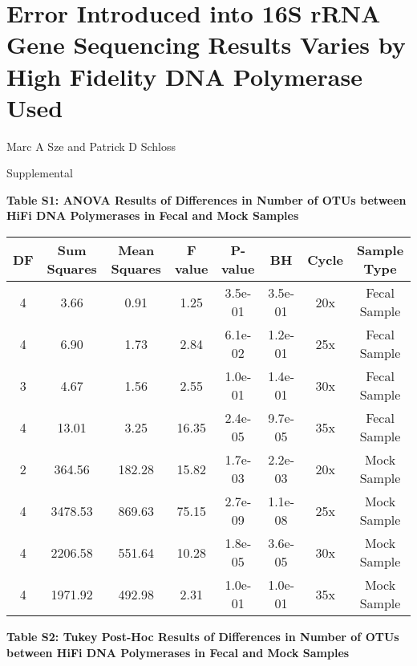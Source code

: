 \documentclass[11pt,]{article}
\title{}
\author{}
\date{}
\begin{document}
\section{Error Introduced into 16S rRNA Gene Sequencing Results Varies
by High Fidelity DNA Polymerase
Used}\label{error-introduced-into-16s-rrna-gene-sequencing-results-varies-by-high-fidelity-dna-polymerase-used}

\vspace{10mm}

\begin{center}
Marc A Sze and Patrick D Schloss

\vspace{10mm}

Supplemental
\end{center}

\newpage

\textbf{Table S1: ANOVA Results of Differences in Number of OTUs between
HiFi DNA Polymerases in Fecal and Mock Samples}

\begin{longtable}[]{@{}cccccccc@{}}
\toprule
DF & Sum Squares & Mean Squares & F value & P-value & BH & Cycle &
Sample Type\tabularnewline
\midrule
\endhead
4 & 3.66 & 0.91 & 1.25 & 3.5e-01 & 3.5e-01 & 20x & Fecal
Sample\tabularnewline
4 & 6.90 & 1.73 & 2.84 & 6.1e-02 & 1.2e-01 & 25x & Fecal
Sample\tabularnewline
3 & 4.67 & 1.56 & 2.55 & 1.0e-01 & 1.4e-01 & 30x & Fecal
Sample\tabularnewline
4 & 13.01 & 3.25 & 16.35 & 2.4e-05 & 9.7e-05 & 35x & Fecal
Sample\tabularnewline
2 & 364.56 & 182.28 & 15.82 & 1.7e-03 & 2.2e-03 & 20x & Mock
Sample\tabularnewline
4 & 3478.53 & 869.63 & 75.15 & 2.7e-09 & 1.1e-08 & 25x & Mock
Sample\tabularnewline
4 & 2206.58 & 551.64 & 10.28 & 1.8e-05 & 3.6e-05 & 30x & Mock
Sample\tabularnewline
4 & 1971.92 & 492.98 & 2.31 & 1.0e-01 & 1.0e-01 & 35x & Mock
Sample\tabularnewline
\bottomrule
\end{longtable}

\newpage

\textbf{Table S2: Tukey Post-Hoc Results of Differences in Number of
OTUs between HiFi DNA Polymerases in Fecal and Mock Samples}
\end{document}
